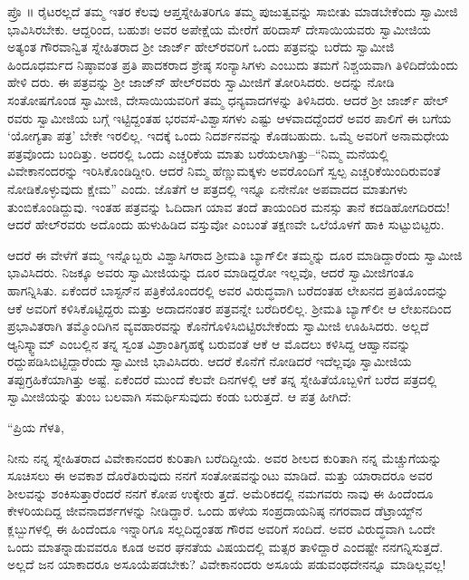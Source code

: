 ಪ್ರೊ ॥ ರೈಟರಲ್ಲದೆ ತಮ್ಮ ಇತರ ಕೆಲವು ಆಪ್ತಸ್ನೇಹಿತರಿಗೂ ತಮ್ಮ ಪುಜುತ್ವವನ್ನು ಸಾಬೀತು ಮಾಡಬೇಕೆಂದು ಸ್ವಾಮೀಜಿ ಭಾವಿಸಿರಬೇಕು. ಆದ್ದರಿಂದ, ಬಹುಶಃ ಅವರ ಅಪೇಕ್ಷೆಯ ಮೇರೆಗೆ ಹರಿದಾಸ್ ದೇಸಾಯಿಯವರು ಸ್ವಾಮೀಜಿಯ ಅತ್ಯಂತ ಗೌರವಾನ್ವಿತ ಸ್ನೇಹಿತರಾದ ಶ್ರೀ ಜಾರ್ಜ್ ಹೇಲ್​ರವರಿಗೆ ಒಂದು ಪತ್ರವನ್ನು ಬರೆದು ಸ್ವಾಮೀಜಿ ಹಿಂದೂಧರ್ಮದ ನಿಷ್ಠಾವಂತ ಪ್ರತಿ ಪಾದಕರಾದ ಶ್ರೇಷ್ಠ ಸಂನ್ಯಾಸಿಗಳು ಎಂಬುದು ತಮಗೆ ನಿಶ್ಚಯವಾಗಿ ತಿಳಿದಿದೆಯೆಂದು ಹೇಳಿ ದರು. ಈ ಪತ್ರವನ್ನು ಶ್ರೀ ಜಾಜ್​ನ್ ಹೇಲ್​ರವರು ಸ್ವಾಮೀಜಿಗೆ ತೋರಿಸಿದರು. ಅದನ್ನು ನೋಡಿ ಸಂತೋಷಗೊಂಡ ಸ್ವಾಮೀಜಿ, ದೇಸಾಯಿಯವರಿಗೆ ತಮ್ಮ ಧನ್ಯವಾದಗಳನ್ನು ತಿಳಿಸಿದರು. ಆದರೆ ಶ್ರೀ ಜಾರ್ಜ್ ಹೇಲ್​ರವರು ಸ್ವಾಮೀಜಿಯ ಬಗ್ಗೆ ಇಟ್ಟಿದ್ದಂತಹ ಭರವಸೆ-ವಿಶ್ವಾಸಗಳು ಎಷ್ಟು ಆಳವಾದದ್ದೆಂದರೆ ಅವರ ಪಾಲಿಗೆ ಈ ಬಗೆಯ ‘ಯೋಗ್ಯತಾ ಪತ್ರ’ ಬೇಕೇ ಇರಲಿಲ್ಲ. ಇದಕ್ಕೆ ಒಂದು ನಿದರ್ಶನವನ್ನು ಕೊಡಬಹುದು. ಒಮ್ಮೆ ಅವರಿಗೆ ಅನಾಮಧೇಯ ಪತ್ರವೊಂದು ಬಂದಿತ್ತು. ಅದರಲ್ಲಿ ಒಂದು ಎಚ್ಚರಿಕೆಯ ಮಾತು ಬರೆಯಲಾಗಿತ್ತು–“ನಿಮ್ಮ ಮನೆಯಲ್ಲಿ ವಿವೇಕಾನಂದರನ್ನು ಇರಿಸಿಕೊಂಡಿದ್ದೀರಿ. ಆದರೆ ನಿಮ್ಮ ಹೆಣ್ಣುಮಕ್ಕಳು ಅವರೊಂದಿಗೆ ಸ್ವಲ್ಪ ಎಚ್ಚರಿಕೆಯಿಂದಿರುವಂತೆ ನೋಡಿಕೊಳ್ಳುವುದು ಕ್ಷೇಮ” ಎಂದು. ಜೊತೆಗೆ ಆ ಪತ್ರದಲ್ಲಿ ಇನ್ನೂ ಏನೇನೋ ಅಪವಾದದ ಮಾತುಗಳು ತುಂಬಿಕೊಂಡಿದ್ದುವು. ಇಂತಹ ಪತ್ರವನ್ನು ಓದಿದಾಗ ಯಾವ ತಂದೆ ತಾಯಂದಿರ ಮನಸ್ಸು ತಾನೆ ಕದಡಿಹೋಗದಿರದು! ಆದರೆ ಹೇಲ್​ರವರು ಅದೊಂದು ಹುಳುಹಿಡಿದ ವಸ್ತುವೋ ಎಂಬಂತೆ ತಕ್ಷಣವೇ ಒಲೆಯೊಳಗೆ ಹಾಕಿ ಸುಟ್ಟುಬಿಟ್ಟರು.

ಆದರೆ ಈ ವೇಳೆಗೆ ತಮ್ಮ ಇನ್ನೊಬ್ಬರು ವಿಶ್ವಾಸಿಗರಾದ ಶ್ರೀಮತಿ ಬ್ಯಾಗ್​ಲೀ ತಮ್ಮನ್ನು ದೂರ ಮಾಡಿದ್ದಾರೆಂದು ಸ್ವಾಮೀಜಿ ಭಾವಿಸಿದರು. ನಿಜಕ್ಕೂ ಅವರು ಸ್ವಾಮೀಜಿಯನ್ನು ದೂರ ಮಾಡಿದ್ದರೋ ಇಲ್ಲವೊ, ಆದರೆ ಸ್ವಾಮೀಜಿಗಂತೂ ಹಾಗನ್ನಿಸಿತು. ಏಕೆಂದರೆ ಬಾಸ್ಟನ್​ನ ಪತ್ರಿಕೆಯೊಂದರಲ್ಲಿ ಅವರ ವಿರುದ್ಧವಾಗಿ ಬರೆದಂತಹ ಲೇಖನದ ಪ್ರತಿಯೊಂದನ್ನು ಆಕೆ ಅವರಿಗೆ ಕಳಿಸಿಕೊಟ್ಟಿದ್ದರು ಮತ್ತು ಅದಾದನಂತರ ಪತ್ರವನ್ನೇ ಬರೆದಿರಲಿಲ್ಲ. ಶ್ರೀಮತಿ ಬ್ಯಾಗ್​ಲೀ ಆ ಲೇಖನದಿಂದ ಪ್ರಭಾವಿತರಾಗಿ ತಮ್ಮೊಂದಿಗಿನ ವ್ಯವಹಾರವನ್ನು ಕೊನೆಗೊಳಿಸಿಬಿಟ್ಟಿರಬೇಕೆಂದು ಸ್ವಾಮೀಜಿ ಊಹಿಸಿದರು. ಅಲ್ಲದೆ ಆ್ಯನಿಸ್ಕ್ವಾಮ್ ಎಂಬಲ್ಲಿನ ತನ್ನ ಸ್ವಂತ ವಿಶ್ರಾಂತಿಗೃಹಕ್ಕೆ ಬರುವಂತೆ ಆಕೆ ಆ ಮೊದಲು ಕಳಿಸಿದ್ದ ಆಹ್ವಾನವನ್ನು ರದ್ದುಪಡಿಸಿಬಿಟ್ಟಿದ್ದಾರೆಂದು ಸ್ವಾಮೀಜಿ ಭಾವಿಸಿದರು. ಆದರೆ ಕೊನೆಗೆ ನೋಡಿದರೆ ಇದೆಲ್ಲವೂ ಸ್ವಾಮೀಜಿಯ ತಪ್ಪುಗ್ರಹಿಕೆಯಾಗಿತ್ತು ಅಷ್ಟೆ. ಏಕೆಂದರೆ ಮುಂದೆ ಕೆಲವೇ ದಿನಗಳಲ್ಲಿ ಆಕೆ ತನ್ನ ಸ್ನೇಹಿತೆಯೊಬ್ಬಳಿಗೆ ಬರೆದ ಪತ್ರದಲ್ಲಿ ಸ್ವಾಮೀಜಿಯನ್ನು ತುಂಬ ಬಲವಾಗಿ ಸಮರ್ಥಿಸುವುದು ಕಂಡು ಬರುತ್ತದೆ. ಆ ಪತ್ರ ಹೀಗಿದೆ:

“ಪ್ರಿಯ ಗೆಳತಿ,

ನೀನು ನನ್ನ ಸ್ನೇಹಿತರಾದ ವಿವೇಕಾನಂದರ ಕುರಿತಾಗಿ ಬರೆದಿದ್ದೀಯೆ. ಅವರ ಶೀಲದ ಕುರಿತಾಗಿ ನನ್ನ ಮೆಚ್ಚುಗೆಯನ್ನು ಸೂಚಿಸಲು ಈ ಅವಕಾಶ ದೊರೆತಿರುವುದು ನನಗೆ ಸಂತೋಷವನ್ನುಂಟು ಮಾಡಿದೆ. ಮತ್ತು ಯಾರಾದರೂ ಅವರ ಶೀಲವನ್ನು ಶಂಕಿಸುತ್ತಾರೆಂದರೆ ನನಗೆ ಕೋಪ ಉಕ್ಕೇರು ತ್ತದೆ. ಅಮೆರಿಕದಲ್ಲಿ ನಮಗವರು ನಾವು ಈ ಹಿಂದೆಂದೂ ಕೇಳರಿಯದಿದ್ದ ಜೀವನಾದರ್ಶಗಳನ್ನು ನೀಡಿದ್ದಾರೆ. ಒಂದು ಹಳೆಯ ಸಂಪ್ರದಾಯನಿಷ್ಠ ನಗರವಾದ ಡೆಟ್ರಾಯ್ಟ್​ನ ಕ್ಲಬ್ಬುಗಳಲ್ಲಿ ಈ ಹಿಂದೆಂದೂ ಇನ್ನಾರಿಗೂ ಸಲ್ಲದಿದ್ದಂತಹ ಗೌರವ ಅವರಿಗೆ ಸಂದಿದೆ. ಅವರ ವಿರುದ್ಧವಾಗಿ ಒಂದೇ ಒಂದು ಮಾತನ್ನಾಡುವವರೂ ಕೂಡ ಅವರ ಘನತೆಯ ವಿಷಯದಲ್ಲಿ ಮತ್ಸರ ತಾಳಿದ್ದಾರೆ ಎಂದಷ್ಟೇ ನನಗನ್ನಿಸುತ್ತದೆ. ಅಲ್ಲದೆ ಜನ ಯಾಕಾದರೂ ಅಸೂಯೆಪಡಬೇಕು? ವಿವೇಕಾನಂದರು ಅಸೂಯೆ ಪಡುವಂಥದೇನನ್ನೂ ಮಾಡಿಲ್ಲವಲ್ಲ!

